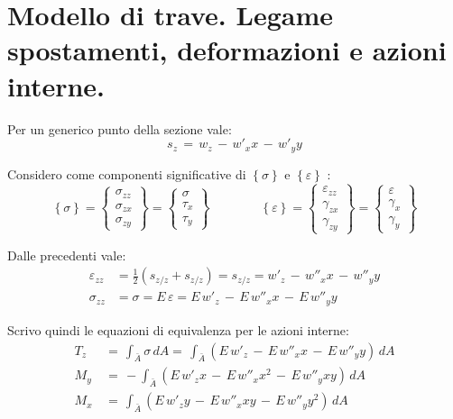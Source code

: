 \section{Modello di trave. Legame spostamenti, deformazioni e azioni interne.}

Per un generico punto della sezione vale:
 \begin{equation*}
        s_z \,=\,  w_z \,-\,w'_x  x\, -\,w'_y  y
 \end{equation*}

 Considero come componenti significative di $\left\{\sigma\right\}$ e $\left\{\varepsilon\right\}$ :
 \begin{equation*}
     \left\{\sigma\right\} = \left\{
    \begin{array}{c}
    \sigma_{zz} \\ \sigma_{zx} \\ \sigma_{zy}
    \end{array}
    \right\} = \left\{
    \begin{array}{c}
    \sigma\\ \tau_x \\ \tau_y
    \end{array}
    \right\}\quad\quad\quad\quad
    \left\{\varepsilon\right\} = \left\{
    \begin{array}{c}
    \varepsilon_{zz} \\ \gamma_{zx} \\ \gamma_{zy}
    \end{array}
    \right\} = \left\{
    \begin{array}{c}
    \varepsilon\\ \gamma_x \\ \gamma_y
    \end{array}
    \right\}
 \end{equation*}

 Dalle precedenti vale:
 \begin{align*}
     \varepsilon_{zz} &= \frac{1}{2} (s_{z/z} +s_{z/z})= s_{z/z} =  w'_z \,-\,w''_x  x\, -\,w''_y  y\\
     \sigma_{zz} &= \sigma = E \,\varepsilon = E\,w'_z \,-\,E\,w''_x  x\, -\,E\,w''_y  y
 \end{align*}

 Scrivo quindi le equazioni di equivalenza per le azioni interne:
 \begin{align*}
    T_z \, &=\, \int_{\bar{A}} \sigma \, dA = \, \int_{\bar{A}} (E\,w'_z \,-\,E\,w''_x  x\, -\,E\,w''_y  y) \, dA \\
    M_y \, &=\, - \int_{\bar{A}} (E\,w'_zx \,-\,E\,w''_x  x^2\, -\,E\,w''_y  xy)  \, dA \\
    M_x \, &=\,  \int_{\bar{A}} (E\,w'_z y\,-\,E\,w''_x  xy\, -\,E\,w''_y  y^2) \, dA \\
\end{align*}


